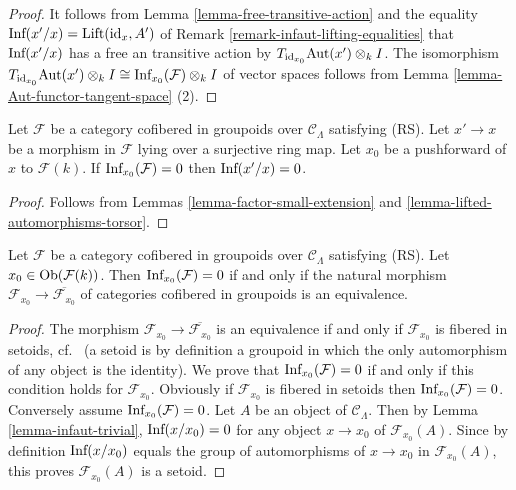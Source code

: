 \begin{proof}
It follows from Lemma \ref{lemma-free-transitive-action} and the equality 
$\textnormal{Inf}(x'/x) = \textnormal{Lift}(\textnormal{id}_{x}, A')$ of Remark 
\ref{remark-infaut-lifting-equalities} that $\textnormal{Inf}(x'/x)$ has a free 
an transitive action by $T_{\textnormal{id}_{x_0}} \textnormal{Aut}(x') 
\otimes_{k} I$.  The isomorphism $T_{\textnormal{id}_{x_0}} 
\textnormal{Aut}(x') \otimes_{k} I \cong \textnormal{Inf}_{x_0}(\mathcal F) 
\otimes_{k} I$ of vector spaces follows from Lemma 
\ref{lemma-Aut-functor-tangent-space} (2).
\end{proof}

\begin{lemma}
\label{lemma-infaut-trivial}
Let $\mathcal F$ be a category cofibered in groupoids over $\mathcal 
C_{\Lambda}$ satisfying \textnormal{(RS)}. Let $x' \rightarrow x$ be a morphism 
in $\mathcal F$ lying over a surjective ring map.  Let $x_0$ be a pushforward 
of $x$ to $\mathcal F(k)$.  If $\textnormal{Inf}_{x_0}(\mathcal F) = 0$ then 
$\textnormal{Inf}(x'/x) = 0$.
\end{lemma}

\begin{proof}
Follows from Lemmas \ref{lemma-factor-small-extension} and 
\ref{lemma-lifted-automorphisms-torsor}.
\end{proof}

\begin{lemma}
\label{lemma-infdef-trivial}
Let $\mathcal F$ be a category cofibered in groupoids over $\mathcal 
C_{\Lambda}$ satisfying (RS). Let $x_0 \in \textnormal{Ob}(\mathcal F(k))$. 
Then $\textnormal{Inf}_{x_0}(\mathcal F) = 0$ if and only if the natural 
morphism $\mathcal F_{x_0} \rightarrow \overline{\mathcal F_{x_0}}$ of 
categories cofibered in groupoids is an equivalence.
\end{lemma}

\begin{proof}
The morphism $\mathcal F_{x_0} \rightarrow \overline{\mathcal F_{x_0}}$ is an 
equivalence if and only if $\mathcal F_{x_0}$ is fibered in setoids, cf.\ 
\cite[Section 4.36]{stacks-project} (a setoid is by definition a groupoid in 
which the only automorphism of any object is the identity).  We prove that 
$\textnormal{Inf}_{x_0}(\mathcal F) = 0$ if and only if this condition holds 
for $\mathcal F_{x_0}$.  Obviously if $\mathcal F_{x_0}$ is fibered in setoids 
then $\textnormal{Inf}_{x_0}(\mathcal F) = 0$.  Conversely assume 
$\textnormal{Inf}_{x_0}(\mathcal F) = 0$.  Let $A$ be an object of $\mathcal 
C_{\Lambda}$. Then by Lemma \ref{lemma-infaut-trivial}, 
$\textnormal{Inf}(x/x_0) = 0$ for any object $x \rightarrow x_0$ of $\mathcal 
F_{x_0}(A)$. Since by definition $\textnormal{Inf}(x/x_0)$ equals the group of 
automorphisms of $x \rightarrow x_0$ in $\mathcal F_{x_0}(A)$, this proves 
$\mathcal F_{x_0}(A)$ is a setoid.
\end{proof}

